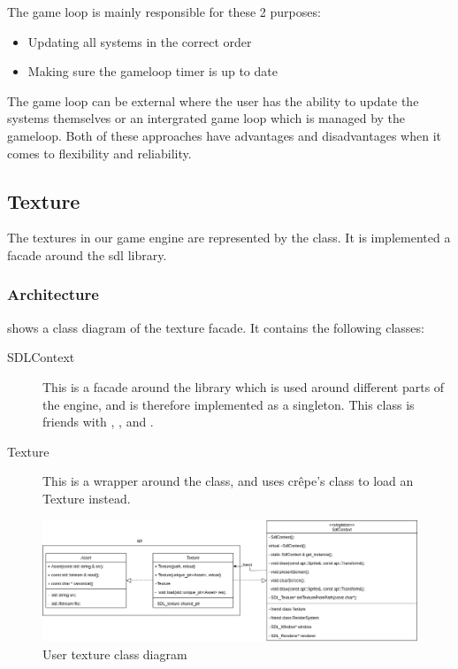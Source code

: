 \documentclass{projdoc}
\begin{document}
The game loop is mainly responsible for these 2 purposes:\noparbreak
\begin{itemize}
	\item Updating all systems in the correct order
	\item Making sure the gameloop timer is up to date
\end{itemize}

The game loop can be external where the user has the ability to update the systems
themselves or an intergrated game loop which is managed by the gameloop. Both of
these approaches have advantages and disadvantages when it comes to flexibility and
reliability.

\subsection{Texture}

The textures in our game engine are represented by the  class. It
is implemented a \gls{facade} around the \gls{sdl} library.

\subsubsection{Architecture}

 shows a class diagram of the texture \gls{facade}. It
contains the following classes:\noparbreak
\begin{description}
	\item[SDLContext] This is a facade around the  library which is
		used around different parts of the engine, and is therefore implemented as a
		singleton. This class is friends with ,
		,  and
		.
	\item[Texture] This is a wrapper around the  class, and
		uses cr\^epe's  class to load an Texture instead.
\end{description}

\begin{figure}
	\centering
	\includegraphics[width=\textwidth]{img/texture.png}
	\caption{User texture class diagram}
	\label{fig:class-texture}
\end{figure}
\end{document}
